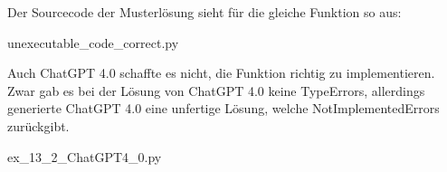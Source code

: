 \documentclass[class=scrbook, crop=false]{standalone}
\begin{document}
    Der Sourcecode der Musterlösung sieht für die gleiche Funktion so aus:
    
    {unexecutable_code_correct.py}

    Auch ChatGPT 4.0 schaffte es nicht, die Funktion richtig zu implementieren.
    Zwar gab es bei der Lösung von ChatGPT 4.0 keine TypeErrors, allerdings generierte ChatGPT 4.0 eine unfertige Lösung, welche
    NotImplementedErrors zurückgibt.
    
    {ex_13_2_ChatGPT4_0.py}
\end{document}
